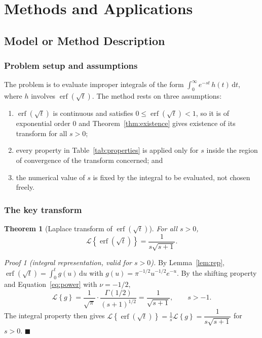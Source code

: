 \documentclass[12pt,a4paper]{article}
\theoremstyle{definition}
\theoremstyle{plain}
\newtheorem{theorem}{Theorem}[section]
\theoremstyle{remark}
\newcommand{\erf}{\operatorname{erf}}
\newcommand{\Lap}[1]{\mathcal{L}\!\left\{#1\right\}}
\newcommand{\dd}{\,\mathrm{d}}
\begin{document}
	\section{Methods and Applications}
	
	\subsection{Model or Method Description}
	
	\subsubsection{Problem setup and assumptions}
	
	The problem is to evaluate improper integrals of the form $\int_0^\infty e^{-st}\,h(t)\dd t$, where $h$ involves $\erf(\sqrt{t})$. The method rests on three assumptions:
	
	\begin{enumerate}[label=A\arabic*.]
		\item $\erf(\sqrt{t})$ is continuous and satisfies $0\le \erf(\sqrt{t})<1$, so it is of exponential order $0$ and Theorem~\ref{thm:existence} gives existence of its transform for all $s>0$;
		\item every property in Table~\ref{tab:properties} is applied only for $s$ inside the region of convergence of the transform concerned; and
		\item the numerical value of $s$ is fixed by the integral to be evaluated, not chosen freely.
	\end{enumerate}
	
	\subsubsection{The key transform}
	
	\begin{theorem}[Laplace transform of $\erf(\sqrt{t})$]\label{thm:key}
		For all $s>0$,
		\begin{equation}\label{eq:key}
			\Lap{\erf(\sqrt{t})}=\frac{1}{s\sqrt{s+1}} .
		\end{equation}
	\end{theorem}
	
	\textit{Proof 1 (integral representation, valid for $s>0$).} By Lemma~\ref{lem:rep}, $\erf(\sqrt{t})=\int_0^t g(u)\dd u$ with $g(u)=\pi^{-1/2}u^{-1/2}e^{-u}$. By the shifting property and Equation~\eqref{eq:power} with $\nu=-1/2$,
	\[
	\Lap{g}=\frac{1}{\sqrt{\pi}}\cdot\frac{\Gamma(1/2)}{(s+1)^{1/2}}=\frac{1}{\sqrt{s+1}},\qquad s>-1.
	\]
	The integral property then gives $\Lap{\erf(\sqrt{t})}=\tfrac{1}{s}\Lap{g}=\dfrac{1}{s\sqrt{s+1}}$ for $s>0$. \hfill$\blacksquare$
	
\end{document}

